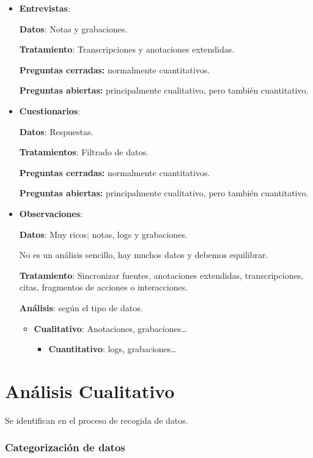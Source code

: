 \documentclass[12pt]{report} %
\begin{document}
\begin{itemize}
\item
  \textbf{Entrevistas}:

  \textbf{Datos}: Notas y grabaciones.

  \textbf{Tratamiento}: Transcripciones y anotaciones extendidas.

  \textbf{Preguntas cerradas:} normalmente cuantitativos.

  \textbf{Preguntas abiertas:} principalmente cualitativo, pero también
  cuantitativo.
\item
  \textbf{Cuestionarios}:

  \textbf{Datos}: Respuestas.

  \textbf{Tratamientos}: Filtrado de datos.

  \textbf{Preguntas cerradas:} normalmente cuantitativos.

  \textbf{Preguntas abiertas:} principalmente cualitativo, pero también
  cuantitativo.
\item
  \textbf{Observaciones}:

  \textbf{Datos}: Muy ricos; notas, logs y grabaciones.

  No es un análisis sencillo, hay muchos datos y debemos equilibrar.

  \textbf{Tratamiento}: Sincronizar fuentes, anotaciones extendidas,
  transcripciones, citas, fragmentos de acciones o interacciones.

  \textbf{Análisis}: según el tipo de datos.

  \begin{itemize}
  
  \item
    \textbf{Cualitativo}: Anotaciones, grabaciones\ldots{}

    \begin{itemize}
    
    \item
      \textbf{Cuantitativo}: logs, grabaciones\ldots{}
    \end{itemize}
  \end{itemize}
\end{itemize}

\section{Análisis Cualitativo}

Se identifican en el proceso de recogida de datos.

\hypertarget{categorizaciuxf3n-de-datos}{%
\subsubsection{Categorización de
datos}\label{categorizaciuxf3n-de-datos}}
\end{document}
